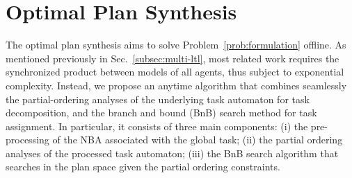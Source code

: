 \section{Optimal Plan Synthesis}\label{subsec:initial-synthesis}
The optimal plan synthesis aims to solve Problem~\ref{prob:formulation} offline.
As mentioned previously in Sec.~\ref{subsec:multi-ltl},
most related work requires the synchronized product between models of all agents,
thus subject to exponential complexity.
Instead, we propose an anytime algorithm that combines seamlessly the partial-ordering analyses
of the underlying task automaton for task decomposition,
and the branch and bound (BnB) search method for task assignment.
In particular, it consists of three main components:
(i) the pre-processing of the NBA associated with the global task;
(ii) the partial ordering analyses of the processed task automaton;
(iii) the BnB search algorithm that searches in the plan space
given the partial ordering constraints.
